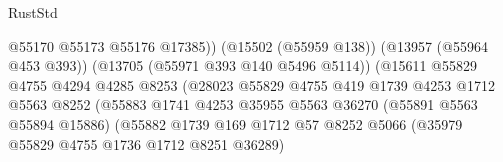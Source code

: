 \begin{lexlean}{RustStd}
\begin{coremodule}
                                                    @55170
                                                    @55173
                                                    @55176
                                                    @17385))
                                                (@15502 (@55959 @138))
                                                (@13957 (@55964 @453 @393))
                                                (@13705 (@55971 @393 @140 @5496 @5114))
                                                (@15611
                                                  @55829
                                                  @4755
                                                  @4294
                                                  @4285
                                                  @8253
                                                  (@28023
                                                    @55829
                                                    @4755
                                                    @419
                                                    @1739
                                                    @4253
                                                    @1712
                                                    @5563
                                                    @8252
                                                    (@55883
                                                      @1741
                                                      @4253
                                                      @35955
                                                      @5563
                                                      @36270
                                                      (@55891 @5563 @55894 @15886)
                                                      (@55882
                                                        @1739
                                                        @169
                                                        @1712
                                                        @57
                                                        @8252
                                                        @5066
                                                        (@35979
                                                          @55829
                                                          @4755
                                                          @1736
                                                          @1712
                                                          @8251
                                                          @36289)

\end{coremodule}
\end{lexlean}
